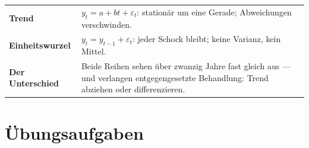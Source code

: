 \begin{warnung}
\begin{center}
{\small
\renewcommand{\arraystretch}{1.52}
\begin{tabular}{@{}P{2.8cm}P{5.8cm}@{}}
\toprule
\textbf{Trend} & $y_t = a + bt + \varepsilon_t$: stationär um eine Gerade; Abweichungen verschwinden.\\
\textbf{Einheitswurzel} & $y_t = y_{t-1} + \varepsilon_t$: jeder Schock bleibt; keine Varianz, kein Mittel.\\
\textbf{Der Unterschied} & Beide Reihen sehen über zwanzig Jahre fast gleich aus --- und verlangen entgegengesetzte Behandlung: Trend abziehen oder differenzieren.\\
\bottomrule
\end{tabular}}
\end{center}

\begin{center}
\begin{minipage}{0.88\textwidth}
\end{minipage}
\end{center}
\end{warnung}

\section{Übungsaufgaben}

